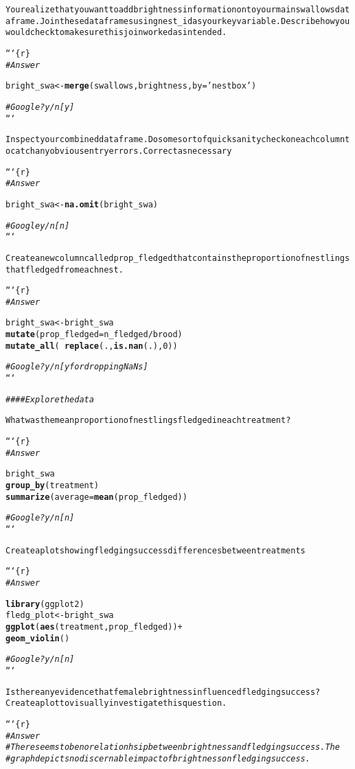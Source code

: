 \documentclass{article}\usepackage[]{graphicx}\usepackage[]{xcolor}
\makeatletter
\newcommand{\hlsng}[1]{\textcolor[rgb]{0.192,0.494,0.8}{#1}}%
\newcommand{\hlcom}[1]{\textcolor[rgb]{0.678,0.584,0.686}{\textit{#1}}}%
\newcommand{\hlkwd}[1]{\textcolor[rgb]{0.737,0.353,0.396}{\textbf{#1}}}%
\newenvironment{kframe}{%
 \def\at@end@of@kframe{}%
 \ifinner\ifhmode%
  \def\at@end@of@kframe{\end{minipage}}%
  \begin{minipage}{\columnwidth}%
 \fi\fi%
 \def\FrameCommand##1{\hskip\@totalleftmargin \hskip-\fboxsep
 \colorbox{shadecolor}{##1}\hskip-\fboxsep
     \hskip-\linewidth \hskip-\@totalleftmargin \hskip\columnwidth}%
 \MakeFramed {\advance\hsize-\width
   \@totalleftmargin\z@ \linewidth\hsize
   \@setminipage}}%
 {\par\unskip\endMakeFramed%
 \at@end@of@kframe}
\newenvironment{knitrout}{}{} %
\makeatother
\begin{document}
\begin{knitrout}
\begin{kframe}
\begin{alltt}
You realize that you want to add brightness information onto your main swallows data frame. Join these data frames using nest_id as your key variable. Describe how you would check to make sure this join worked as intended.

```\{r\}
\hlcom{#Answer}

bright_swa <- \hlkwd{merge}(swallows, brightness, by=\hlsng{'nestbox'})

\hlcom{# Google? y/n [y]}
```

Inspect your combined data frame. Do some sort of quick sanity check on each column to catch any obvious entry errors. Correct as necessary

```\{r\}
\hlcom{# Answer}

bright_swa <- \hlkwd{na.omit}(bright_swa)

\hlcom{# Google y/n [n]}
```

Create a new column called prop_fledged that contains the proportion of nestlings that fledged from each nest.

```\{r\}
\hlcom{#Answer}

bright_swa <- bright_swa %>%
  \hlkwd{mutate}(prop_fledged = n_fledged/brood) %>%
  \hlkwd{mutate_all}(~\hlkwd{replace}(., \hlkwd{is.nan}(.), 0))


\hlcom{# Google? y/n [y for dropping NaNs]}
```

\hlcom{#### Explore the data}

What was the mean proportion of nestlings fledged in each treatment?

```\{r\}
\hlcom{# Answer}

bright_swa %>%
  \hlkwd{group_by}(treatment) %>%
  \hlkwd{summarize}(average = \hlkwd{mean}(prop_fledged))

\hlcom{# Google? y/n [n]}
```

Create a plot showing fledging success differences between treatments

```\{r\}
\hlcom{#Answer}

\hlkwd{library}(ggplot2)
fledg_plot <- bright_swa %>%
  \hlkwd{ggplot}(\hlkwd{aes}(treatment, prop_fledged)) +
  \hlkwd{geom_violin}()

\hlcom{# Google? y/n [n]}
```

Is there any evidence that female brightness influenced fledging success? Create a plot to visually investigate this question.

```\{r\}
\hlcom{#Answer}
\hlcom{# There seems to be no relationhsip between brightness and fledging success.The}
\hlcom{# graph depicts no discernable impact of brightness on fledging success.}


\end{alltt}
\end{kframe}
\end{knitrout}
\end{document}
